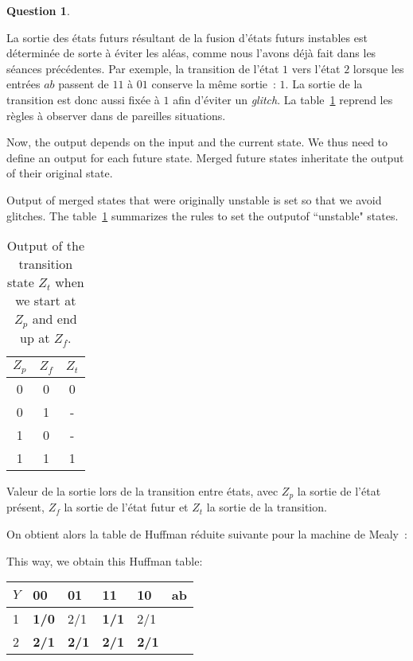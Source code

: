 \documentclass[11pt,a4paper,dvipsnames]{article}
\theoremstyle{definition}%
\newtheorem{Q}{Question}[] %
\newcommand{\fr}[1]{
 	\ifthenelse {\boolean{fr}} {#1} {}
 }
\newcommand{\en}[1]{
 	\ifthenelse {\boolean{en}} {#1} {}
 }
\begin{document}
\begin{Q}
{\begin{enumerate}
{		La sortie des états futurs résultant de la fusion d'états futurs instables est déterminée de sorte à éviter les aléas, comme nous l'avons déjà fait dans les séances précédentes.
		Par exemple, la transition de l'état $1$ vers l'état $2$ lorsque les entrées $ab$ passent de $11$ à $01$ conserve la même sortie~: $1$.
		La sortie de la transition est donc aussi fixée à $1$ afin d'éviter un \textit{glitch}. La table~\ref{tab:sortie-transition} reprend les règles à observer dans de pareilles situations.}

		\en{Now, the output depends on the input and the current state.
		We thus need to define an output for each future state.
		Merged future states inheritate the output of their original state.

		Output of merged states that were originally unstable is set so that we avoid glitches.
		The table~\ref{tab:sortie-transition} summarizes the rules to set the outputof ``unstable" states.}
		\begin{table}[H]
			\centering
			\begin{tabular}{ccc}
			$Z_p$ & $Z_f$ & $Z_t$ \\ \hline
			0 & 0 & 0 \\
			0 & 1 & - \\
			1 & 0 & - \\
			1 & 1 & 1 \\
			\end{tabular}
			\fr{\caption{Valeur de la sortie lors de la transition entre états, avec $Z_p$ la sortie de l'état présent, $Z_f$ la sortie de l'état futur et $Z_t$ la sortie de la transition.}}
			\en{\caption{Output of the transition state $Z_t$ when we start at $Z_p$ and end up at $Z_f$.}}
			\label{tab:sortie-transition}
		\end{table}


		\fr{On obtient alors la table de Huffman réduite suivante pour la machine de Mealy~:}
		\en{This way, we obtain this Huffman table:}

		\begin{center}
		\begin{tabular}{|l|l|l|l|l|l}
		\hline
		$Y$ & 00         & 01         & 11         & 10         & \multicolumn{1}{l|}{ab} \\ \hline
		1           & \textbf{1/0} & 2/1          & \textbf{1/1}          & 2/1          &  \\ \cline{1-5}
		2           & \textbf{2/1}          & \textbf{2/1} & \textbf{2/1} & \textbf{2/1} &  \\ \cline{1-5}
		\end{tabular}
		\end{center}


\end{enumerate}}
\end{Q}
\end{document}

